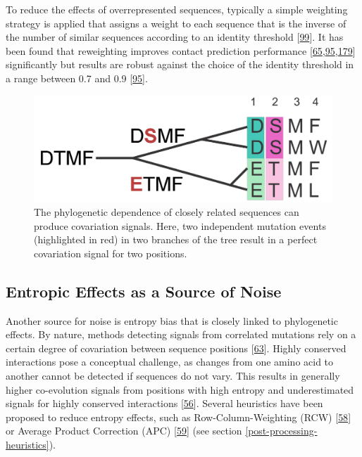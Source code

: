 \documentclass[11pt,a4paper,twoside]{book}
\theoremstyle{definition}
\theoremstyle{definition}
\theoremstyle{remark}
\begin{document}
To reduce the effects of overrepresented sequences, typically a simple
weighting strategy is applied that assigns a weight to each sequence
that is the inverse of the number of similar sequences according to an
identity threshold {[}\protect\hyperlink{ref-Stein2015a}{99}{]}. It has
been found that reweighting improves contact prediction performance
{[}\protect\hyperlink{ref-Jones2012}{65},\protect\hyperlink{ref-Morcos2011}{95},\protect\hyperlink{ref-Buslje2009}{179}{]}
significantly but results are robust against the choice of the identity
threshold in a range between 0.7 and 0.9
{[}\protect\hyperlink{ref-Morcos2011}{95}{]}.






\begin{figure}

{\centering \includegraphics[width=0.6\linewidth]{img/intro/phylogenetic_effect} 

}

\caption{The phylogenetic dependence of closely
related sequences can produce covariation signals. Here, two independent
mutation events (highlighted in red) in two branches of the tree result
in a perfect covariation signal for two positions.}\label{fig:phylogenetic-effect}
\end{figure}

\subsection{Entropic Effects as a Source of
Noise}\label{entropic-effects-as-a-source-of-noise}

Another source for noise is entropy bias that is closely linked to
phylogenetic effects. By nature, methods detecting signals from
correlated mutations rely on a certain degree of covariation between
sequence positions {[}\protect\hyperlink{ref-Burger2010}{63}{]}. Highly
conserved interactions pose a conceptual challenge, as changes from one
amino acid to another cannot be detected if sequences do not vary. This
results in generally higher co-evolution signals from positions with
high entropy and underestimated signals for highly conserved
interactions {[}\protect\hyperlink{ref-Fodor2004}{56}{]}. Several
heuristics have been proposed to reduce entropy effects, such as
Row-Column-Weighting (RCW)
{[}\protect\hyperlink{ref-Gouveia_Oliveira2007}{58}{]} or Average
Product Correction (APC) {[}\protect\hyperlink{ref-Dunn2008}{59}{]} (see
section \ref{post-processing-heuristics}).
\end{document}
